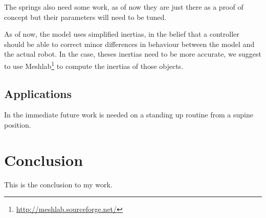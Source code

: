 The springs also need some work, as of now they are just there as a proof of concept but their parameters will need to be tuned.

As of now, the model uses simplified inertias, in the belief that a controller should be able to correct minor differences in behaviour between the model and the actual robot. In the case, theses inertias need to be more accurate, we suggest to use Meshlab\footnote{\url{http://meshlab.sourceforge.net/}} to compute the inertias of those objects.

\subsection{Applications}
In the immediate future work is needed on a standing up routine from a supine position.

\section{Conclusion}
This is the conclusion to my work.
